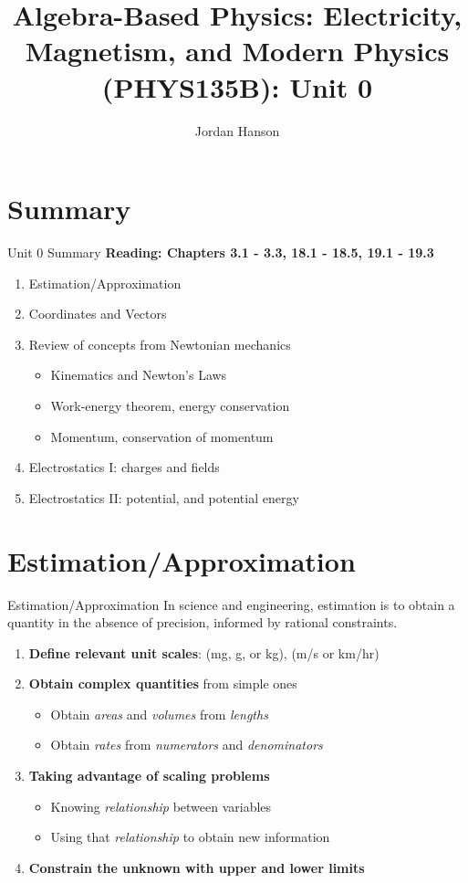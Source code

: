 \documentclass{beamer}
\title{Algebra-Based Physics: Electricity, Magnetism, and Modern Physics (PHYS135B): Unit 0}
\author{Jordan Hanson}
\institute{Whittier College Department of Physics and Astronomy}
\begin{document}
\maketitle

\section{Summary}

\begin{frame}{Unit 0 Summary}
\textbf{Reading: Chapters 3.1 - 3.3, 18.1 - 18.5, 19.1 - 19.3}
\begin{enumerate}
\item Estimation/Approximation
\item Coordinates and Vectors
\item Review of concepts from Newtonian mechanics
\begin{itemize}
\item Kinematics and Newton's Laws
\item Work-energy theorem, energy conservation
\item Momentum, conservation of momentum
\end{itemize}
\item Electrostatics I: charges and fields
\item Electrostatics II: potential, and potential energy
\end{enumerate}
\end{frame}

\section{Estimation/Approximation}

\begin{frame}{Estimation/Approximation}
In science and engineering, \alert{estimation} is to obtain a quantity in the absence of precision, informed by rational constraints.
\begin{enumerate}
\item \textbf{Define relevant \alert{unit scales}}: (mg, g, or kg), (m/s or km/hr)
\item \textbf{Obtain \alert{complex quantities}} from simple ones
\begin{itemize}
\item Obtain \textit{areas} and \textit{volumes} from \textit{lengths}
\item Obtain \textit{rates} from \textit{numerators} and \textit{denominators}
\end{itemize}
\item \textbf{Taking advantage of \alert{scaling problems}}
\begin{itemize}
\item Knowing \textit{relationship} between variables
\item Using that \textit{relationship} to obtain new information
\end{itemize}
\item \textbf{Constrain the unknown with \alert{upper} and \alert{lower} limits}
\end{enumerate}
\end{frame}
\end{document}
